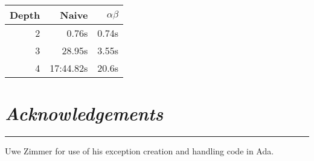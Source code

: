 \documentclass[10pt]{report}
\begin{document}
\begin{multicols}{2}
\begin{center}
  \begin{tabular}{r | r | r}
    Depth & Naive & $\alpha\beta$ \\
    \hline
    2 & 0.76s & 0.74s\\
    3 & 28.95s & 3.55s\\
    4 &  17:44.82s & 20.6s \\
  \end{tabular}
\end{center}

\section*{\emph{\textmd{Acknowledgements}}}
\hrule
\vspace{0.4cm}

Uwe Zimmer for use of his exception creation and handling code in Ada.

\end{multicols}
\end{document}
